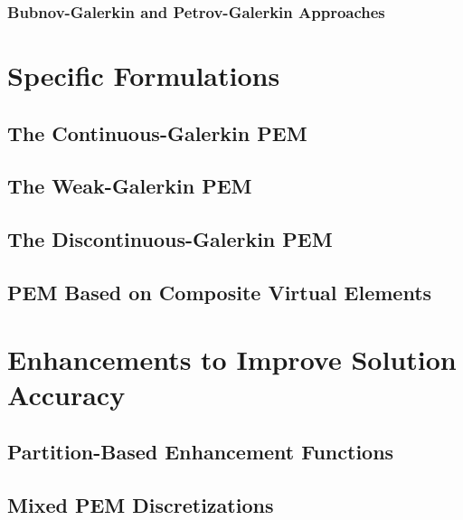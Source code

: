 \subsubsection*{Bubnov-Galerkin and Petrov-Galerkin Approaches}

\section{Specific Formulations}

\subsection*{The Continuous-Galerkin PEM}


\subsection*{The Weak-Galerkin PEM}


\subsection*{The Discontinuous-Galerkin PEM}

	
\subsection*{PEM Based on Composite Virtual Elements}


\section{Enhancements to Improve Solution Accuracy}


\subsection*{Partition-Based Enhancement Functions}
\subsection*{Mixed PEM Discretizations}
